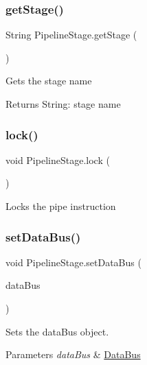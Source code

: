 \subsubsection{\texorpdfstring{get\+Stage()}{getStage()}}
{\footnotesize\ttfamily String Pipeline\+Stage.\+get\+Stage (\begin{DoxyParamCaption}{ }\end{DoxyParamCaption})\hspace{0.3cm}{\ttfamily [private]}}

Gets the stage name \begin{DoxyReturn}{Returns}
String\+: stage name 
\end{DoxyReturn}
\mbox{\label{class_pipeline_stage_a12c4e47d7abbf17c0042d4b41464fae0}} 
\subsubsection{\texorpdfstring{lock()}{lock()}}
{\footnotesize\ttfamily void Pipeline\+Stage.\+lock (\begin{DoxyParamCaption}{ }\end{DoxyParamCaption})\hspace{0.3cm}{\ttfamily [package]}}

Locks the pipe instruction \mbox{\label{class_pipeline_stage_adc91fb5b9c859a597c6a889c822edb18}} 
\subsubsection{\texorpdfstring{set\+Data\+Bus()}{setDataBus()}}
{\footnotesize\ttfamily void Pipeline\+Stage.\+set\+Data\+Bus (\begin{DoxyParamCaption}\item[{\mbox{\hyperlink{class_data_bus}{Data\+Bus}}}]{data\+Bus }\end{DoxyParamCaption})\hspace{0.3cm}{\ttfamily [package]}}

Sets the data\+Bus object. 
\begin{DoxyParams}{Parameters}
{\em data\+Bus} & \mbox{\hyperlink{class_data_bus}{Data\+Bus}} \\
\hline
\end{DoxyParams}
\mbox{\label{class_pipeline_stage_a5bf1a125f39f8fbcce67d892b67c80af}} 
